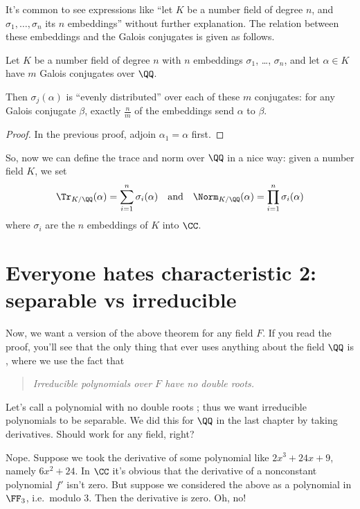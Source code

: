 It's common to see expressions like ``let $K$ be a number field of degree $n$,
and $\sigma_1, \dots, \sigma_n$ its $n$ embeddings'' without further explanation.
The relation between these embeddings and the Galois conjugates is given as follows.
\begin{theorem}
	\label{thm:conj_distrb}
	Let $K$ be a number field of degree $n$
	with $n$ embeddings $\sigma_1$, \dots, $\sigma_n$,
	and let $\alpha \in K$ have $m$ Galois conjugates over $\QQ$.

	Then $\sigma_j(\alpha)$ is ``evenly distributed''
	over each of these $m$ conjugates: for any Galois conjugate $\beta$,
	exactly $\frac nm$ of the embeddings send $\alpha$ to $\beta$.
\end{theorem}
\begin{proof}
	In the previous proof, adjoin $\alpha_1 = \alpha$ first.
\end{proof}

So, now we can define the trace and norm over $\QQ$ in a nice way:
given a number field $K$, we set
\[
	\Tr_{K/\QQ}(\alpha) = \sum_{i=1}^n \sigma_i(\alpha)
	\quad\text{and}\quad
	\Norm_{K/\QQ}(\alpha) = \prod_{i=1}^n \sigma_i(\alpha)
\]
where $\sigma_i$ are the $n$ embeddings of $K$ into $\CC$.

\section{Everyone hates characteristic 2: separable vs irreducible}
Now, we want a version of the above theorem for any field $F$.
If you read the proof, you'll see that the only thing that ever uses anything about the field $\QQ$
is , where we use the fact that
\begin{quote}
	\itshape Irreducible polynomials over $F$ have no double roots.
\end{quote}

Let's call a polynomial with no double roots ;
thus we want irreducible polynomials to be separable.
We did this for $\QQ$ in the last chapter by taking derivatives.
Should work for any field, right?

Nope.
Suppose we took the derivative of some polynomial like $2x^3 + 24x + 9$,
namely $6x^2 + 24$.
In $\CC$ it's obvious that the derivative of a nonconstant polynomial $f'$ isn't zero.
But suppose we considered the above as a polynomial in $\FF_3$, i.e.\ modulo $3$.
Then the derivative is zero.
Oh, no!

